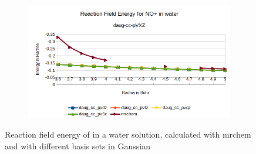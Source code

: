 \documentclass[../master_thesis.tex]{subfiles}
\begin{document}
\begin{figure}[h!]
\begin{subfigure}[b]{0.75\linewidth}
    \includegraphics[width=\linewidth]{img/Erdaugnop.png}
  \end{subfigure}
  \caption[Energy plots for ]{Reaction field energy of  in a water solution, calculated with mrchem
  and with different basis sets in Gaussian}
  \label{fig:nopEnergyplots}

\end{figure}
\end{document}
